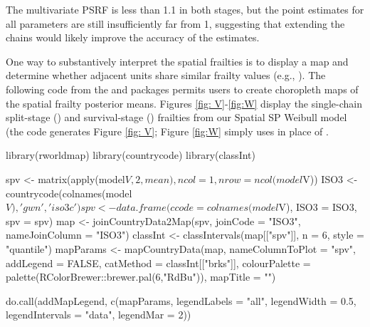 \noindent The multivariate PSRF is less than 1.1 in both stages, but the point estimates for all parameters are still insufficiently far from 1, suggesting that extending the chains would likely improve the accuracy of the estimates.




One way to substantively interpret the spatial frailties is to display a map and determine whether adjacent units share similar frailty values (e.g., \citealp{darmofal2009bayesian}). The following code from the  \citep{countrycode-package} and  \citep{rworldmap-package} packages permits users to create choropleth maps of the spatial frailty posterior means. Figures \ref{fig: V}-\ref{fig:W} display the single-chain split-stage () and survival-stage () frailties from our Spatial SP Weibull model (the code generates Figure \ref{fig: V}; Figure \ref{fig:W} simply uses  in place of . 


\begin{example}
library(rworldmap)
library(countrycode)
library(classInt)

spv  <- matrix(apply(model$V, 2, mean), ncol = 1, nrow = ncol(model$V))
ISO3 <- countrycode(colnames(model$V) ,'gwn','iso3c')
spv  <- data.frame(ccode = colnames(model$V), ISO3 = ISO3, spv = spv)
map  <- joinCountryData2Map(spv, joinCode = "ISO3", nameJoinColumn = "ISO3")
classInt <- classIntervals(map[["spv"]], n = 6, style = "quantile")
mapParams <- mapCountryData(map,
                            nameColumnToPlot = "spv",
                            addLegend = FALSE,
                            catMethod = classInt[["brks"]],
                            colourPalette = palette(RColorBrewer::brewer.pal(6,"RdBu")),
                            mapTitle = "")

do.call(addMapLegend, c(mapParams, legendLabels = "all", legendWidth = 0.5,
                                   legendIntervals = "data", legendMar = 2))
\end{example}

